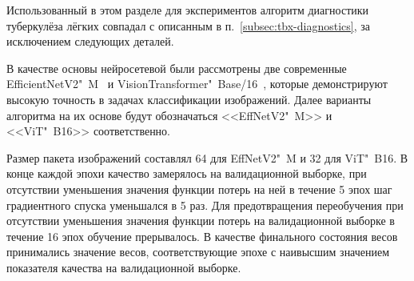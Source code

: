 Использованный в этом разделе для экспериментов алгоритм диагностики туберкулёза лёгких совпадал с описанным в п.~\ref{subsec:tbx-diagnostics}, за исключением следующих деталей.

В качестве основы нейросетевой  были рассмотрены две современные  EfficientNetV2"~M~\cite{tan2021efficientnetv2} и VisionTransformer"~Base/16~\cite{dosovitskiy2021an}, которые демонстрируют высокую точность в задачах классификации изображений. Далее варианты алгоритма на их основе будут обозначаться <<EffNetV2"~M>> и <<ViT"~B16>> соответственно. 

Размер пакета изображений составлял 64 для  EffNetV2"~M и 32 для ViT"~B16. В конце каждой эпохи качество  замерялось на валидационной выборке, при отсутствии уменьшения значения функции потерь на ней в течение 5 эпох шаг градиентного спуска уменьшался в 5 раз. Для предотвращения переобучения при отсутствии уменьшения значения функции потерь на валидационной выборке в течение 16 эпох обучение прерывалось. В качестве финального состояния весов  принимались значение весов, соответствующие эпохе с наивысшим значением показателя качества на валидационной выборке. %

%
%
%

